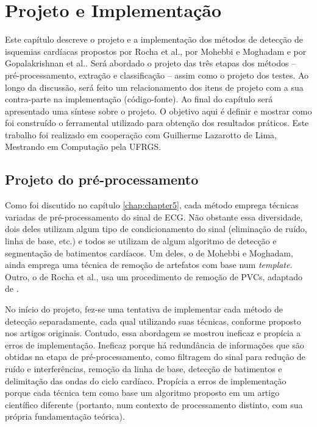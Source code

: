 
\chapter[Projeto e Implementação]{Projeto e Implementação}
\thispagestyle{empty}
\label{chap:chapter6}

Este capítulo descreve o projeto e a implementação dos métodos de detecção de isquemias cardíacas propostos por Rocha et al., por Mohebbi e Moghadam e por Gopalakrishnan et al.. Será abordado o projeto das três etapas dos métodos -- pré-processamento, extração e classificação -- assim como o projeto dos testes. Ao longo da discussão, será feito um relacionamento dos itens de projeto com a sua contra-parte na implementação (código-fonte). Ao final do capítulo será apresentado uma síntese sobre o projeto. O objetivo aqui é definir e mostrar como foi construído o ferramental utilizado para obtenção dos resultados práticos. Este trabalho foi realizado em cooperação com Guilherme Lazarotto de Lima, Mestrando em Computação pela UFRGS.

\section{Projeto do pré-processamento}
Como foi discutido no capítulo \ref{chap:chapter5}, cada método emprega técnicas variadas de pré-processamento do sinal de ECG. Não obstante essa diversidade, dois deles utilizam algum tipo de condicionamento do sinal (eliminação de ruído, linha de base, etc.) e todos se utilizam de algum algoritmo de detecção e segmentação de batimentos cardíacos. Um deles, o de Mohebbi e Moghadam, ainda emprega uma técnica de remoção de artefatos com base num \emph{template}. Outro, o de Rocha et al., usa um procedimento de remoção de PVCs, adaptado de \cite{Couceiro2008}.

No início do projeto, fez-se uma tentativa de implementar cada método de detecção separadamente, cada qual utilizando suas técnicas, conforme proposto nos artigos originais. Contudo, essa abordagem se mostrou ineficaz e propícia a erros de implementação. Ineficaz porque há redundância de informações que são obtidas na etapa de pré-processamento, como filtragem do sinal para redução de ruído e interferências, remoção da linha de base, detecção de batimentos e delimitação das ondas do ciclo cardíaco. Propícia a erros de implementação porque cada técnica tem como base um algoritmo proposto em um artigo científico diferente (portanto, num contexto de processamento distinto, com sua própria fundamentação teórica).

